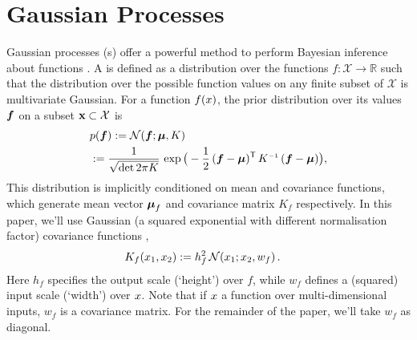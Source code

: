 \documentclass{article}
\begin{document}



\section{Gaussian Processes}
Gaussian processes (\gp s) offer a powerful method to perform Bayesian inference about functions \citep{GPsBook}. A \gpb is defined as a distribution over the functions $f: \mathcal{X} \rightarrow \mathbb{R}$ such that the distribution over the possible function values on any finite subset of $\mathcal{X}$ is multivariate Gaussian.  For a function $f(\lfv)$, the prior distribution over its values $\vf$ on a subset $\vlfv \subset \mathcal{X}$ is
\begin{align}%
\textstyle
 &\po{\vf}\deq \N{\vf}{\vmu}{K}\\
 &\deq\frac{1}{\sqrt{\det{2\pi K}}}\,\exp \big(-\frac{1}{2}\,(\vf-\vmu)\tra\,K\inv\,(\vf-\vmu)\big),
\end{align}
This distribution is implicitly conditioned on mean and covariance functions, which generate mean vector $\vmu_{f}$ and covariance matrix $K_{f}$ respectively. 
In this paper, we'll use Gaussian (a squared exponential with different normalisation factor) covariance functions ,
\begin{align} \label{eq:Gaussian_cov_fn}
\textstyle
K_{f}(\lfv_1,\lfv_2)& \deq h_f^2\,\N{\lfv_1}{\lfv_2}{w_{f}}.
\end{align} 
Here $h_f$ specifies the output scale (`height') over $f$, while $w_f$ defines a (squared) input scale (`width') over $\lfv$. Note that if $\lfv$ a function over multi-dimensional inputs, $w_f$ is a covariance matrix. For the remainder of the paper, we'll take $w_f$ as diagonal. 
\end{document}
